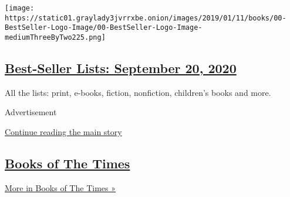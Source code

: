 \begin{enumerate}
  \texttt{[image: https://static01.graylady3jvrrxbe.onion/images/2019/01/11/books/00-BestSeller-Logo-Image/00-BestSeller-Logo-Image-mediumThreeByTwo225.png]}

  \hypertarget{best-seller-lists-september-20-2020}{%
  \subsection{\texorpdfstring{\href{/interactive/2020/01/29/books/review/best-sellers-promo-for-front-copy2.html}{Best-Seller
  Lists: September 20,
  2020}}{Best-Seller Lists: September 20, 2020}}\label{best-seller-lists-september-20-2020}}

  All the lists: print, e-books, fiction, nonfiction, children's books
  and more.
\end{enumerate}

Advertisement

\protect\hyperlink{after-mid1}{Continue reading the main story}

\hypertarget{books-of-the-times-1}{%
\subsection{\texorpdfstring{\href{/column/books-of-the-times}{Books of
The Times}}{Books of The Times}}\label{books-of-the-times-1}}

\href{/column/books-of-the-times}{More in Books of The Times »}

